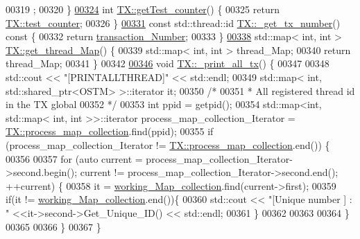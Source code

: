 \begin{DoxyCode}
00319 ;
00320 \}
\hypertarget{_t_x_8cpp_source.tex_l00324}{}\hyperlink{class_t_x_ae9bf97930c4670f59d334b345353a71e_ae9bf97930c4670f59d334b345353a71e}{00324} \textcolor{keywordtype}{int} \hyperlink{class_t_x_ae9bf97930c4670f59d334b345353a71e_ae9bf97930c4670f59d334b345353a71e}{TX::getTest\_counter}() \{
00325     \textcolor{keywordflow}{return} \hyperlink{class_t_x_a25838234aab99ae891a90eb8623a8b3c_a25838234aab99ae891a90eb8623a8b3c}{TX::test\_counter};
00326 \}
\hypertarget{_t_x_8cpp_source.tex_l00331}{}\hyperlink{class_t_x_a9eba04944d449285905b60ec47223cff_a9eba04944d449285905b60ec47223cff}{00331} \textcolor{keyword}{const} std::thread::id \hyperlink{class_t_x_a9eba04944d449285905b60ec47223cff_a9eba04944d449285905b60ec47223cff}{TX::\_get\_tx\_number}()\textcolor{keyword}{ const }\{
00332     \textcolor{keywordflow}{return} \hyperlink{class_t_x_a145a1c74b521f277fe481971a930b249_a145a1c74b521f277fe481971a930b249}{transaction\_Number};
00333 \}
\hypertarget{_t_x_8cpp_source.tex_l00338}{}\hyperlink{class_t_x_a3f5671423cb7b9f9c98f8a25f2a4b545_a3f5671423cb7b9f9c98f8a25f2a4b545}{00338} std::map< int, int > \hyperlink{class_t_x_a3f5671423cb7b9f9c98f8a25f2a4b545_a3f5671423cb7b9f9c98f8a25f2a4b545}{TX::get\_thread\_Map}() \{
00339     std::map< int, int > thread\_Map;
00340     \textcolor{keywordflow}{return} thread\_Map;
00341 \}
00342 
\hypertarget{_t_x_8cpp_source.tex_l00346}{}\hyperlink{class_t_x_a3d96ed91eb9ec73e16589f705661c5a7_a3d96ed91eb9ec73e16589f705661c5a7}{00346} \textcolor{keywordtype}{void} \hyperlink{class_t_x_a3d96ed91eb9ec73e16589f705661c5a7_a3d96ed91eb9ec73e16589f705661c5a7}{TX::\_print\_all\_tx}() \{
00347 
00348     std::cout << \textcolor{stringliteral}{"[PRINTALLTHREAD]"} << std::endl;
00349     std::map< int, std::shared\_ptr<OSTM> >::iterator it;
00350     \textcolor{comment}{/*}
00351 \textcolor{comment}{     * All registered thread id in the TX global }
00352 \textcolor{comment}{     */}
00353     \textcolor{keywordtype}{int} ppid = getpid();
00354     std::map<int, std::map< int, int >>::iterator process\_map\_collection\_Iterator = 
      \hyperlink{class_t_x_aea5b8eedcd5059384155576b3979a5f6_aea5b8eedcd5059384155576b3979a5f6}{TX::process\_map\_collection}.find(ppid);
00355     \textcolor{keywordflow}{if} (process\_map\_collection\_Iterator != \hyperlink{class_t_x_aea5b8eedcd5059384155576b3979a5f6_aea5b8eedcd5059384155576b3979a5f6}{TX::process\_map\_collection}.end()) \{
00356 
00357         \textcolor{keywordflow}{for} (\textcolor{keyword}{auto} current = process\_map\_collection\_Iterator->second.begin(); current != 
      process\_map\_collection\_Iterator->second.end(); ++current) \{
00358             it = \hyperlink{class_t_x_a81aafda16e2f20e36ec6c68e584668ff_a81aafda16e2f20e36ec6c68e584668ff}{working\_Map\_collection}.find(current->first);
00359             \textcolor{keywordflow}{if}(it != \hyperlink{class_t_x_a81aafda16e2f20e36ec6c68e584668ff_a81aafda16e2f20e36ec6c68e584668ff}{working\_Map\_collection}.end())\{
00360                 std::cout << \textcolor{stringliteral}{"[Unique number ] : "} <<it->second->Get\_Unique\_ID() << std::endl;
00361             \}
00362 
00363             
00364         \}
00365      
00366     \}
00367 \}
\end{DoxyCode}
